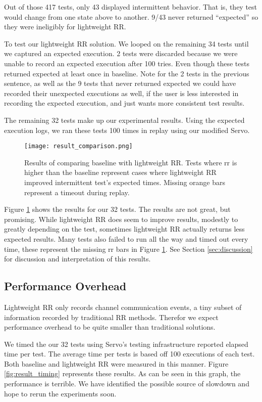 Out of those 417 tests, only 43 displayed intermittent behavior. That is, they test
would change from one state above to another. 9/43 never returned
``expected'' so they were ineligibly for lightweight RR.

To test our lightweight RR solution. We looped on the remaining 34 tests until
we captured an expected execution. 2 tests were
discarded because we were unable to record an expected execution after 100
tries. Even though these tests returned expected at least once in baseline. Note
for the 2 tests in the previous sentence, as well as the 9 tests that never returned
expected we could have recorded their unexpected executions as well, if the user
is less interested in recording the expected execution, and just wants more consistent
test results.

The remaining 32 tests make up our experimental results. Using the expected execution
logs, we ran these tests 100 times in replay using our modified Servo.

\begin{figure}
  \texttt{[image: result\_comparison.png]}
  \caption{Results of comparing baseline with lightweight RR. Tests where rr
    is higher than the baseline represent cases where lightweight RR improved intermittent
    test's expected times. Missing orange bars represent a timeout during replay. }
  \label{fig:result1}
\end{figure}

Figure \ref{fig:result1} shows the results for our 32 tests. The results are
not great, but promising. While lightweight RR does seem to improve results,
modestly to greatly depending on the test, sometimes lightweight RR actually returns
less expected results. Many tests also failed to run all the way and timed out
every time, these represent the missing rr bars in Figure \ref{fig:result1}. See Section \ref{sec:discussion} for discussion and interpretation of this results.

\subsection{Performance Overhead}
Lightweight RR only records channel communication events, a tiny subset of information
recorded by traditional RR methods. Therefor we expect performance overhead to be quite
smaller than traditional solutions.

We timed the our 32 tests using Servo's testing infrastructure reported elapsed time
per test. The average time per tests is based off 100 executions of each test. Both
baseline and lightweight RR were measured in this manner. Figure \ref{fig:result_timing}
represents these results. As can be seen in this graph, the performance is terrible.
We have identified the possible source of slowdown and hope to rerun the experiments
soon.

